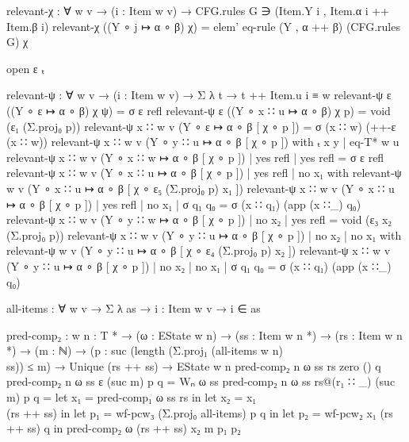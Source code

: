 {\begin{code}
			  relevant-χ : ∀ {w v} → (i : Item w v) → CFG.rules G ∋ (Item.Y i , Item.α i ++ Item.β i)
			  relevant-χ ((Y ∘ j ↦ α ∘ β) {χ}) = elem' eq-rule (Y , α ++ β) (CFG.rules G) χ

			  open ε ₜ

			  relevant-ψ : ∀ {w v} → (i : Item w v) → Σ λ t → t ++ Item.u i ≡ w
			  relevant-ψ {ε} ((Y ∘ ε ↦ α ∘ β) {χ} {ψ}) = σ ε refl
			  relevant-ψ {ε} ((Y ∘ x ∷ u ↦ α ∘ β) {χ} {p}) = void (ε₁ (Σ.proj₀ p))
			  relevant-ψ {x ∷ w} {v} (Y ∘ ε ↦ α ∘ β [ χ ∘ p ]) = σ (x ∷ w) (++-ε (x ∷ w))
			  relevant-ψ {x ∷ w} {v} (Y ∘ y ∷ u ↦ α ∘ β [ χ ∘ p ]) with ₜ x y | eq-T* w u
			  relevant-ψ {x ∷ w} {v} (Y ∘ x ∷ w ↦ α ∘ β [ χ ∘ p ]) | yes refl | yes refl = σ ε refl
			  relevant-ψ {x ∷ w} {v} (Y ∘ x ∷ u ↦ α ∘ β [ χ ∘ p ]) | yes refl | no x₁ with relevant-ψ {w} {v} (Y ∘ x ∷ u ↦ α ∘ β [ χ ∘ ε₅ (Σ.proj₀ p) x₁ ])
			  relevant-ψ {x ∷ w} {v} (Y ∘ x ∷ u ↦ α ∘ β [ χ ∘ p ]) | yes refl | no x₁ | σ q₁ q₀ = σ (x ∷ q₁) (app (x ∷_) q₀)
			  relevant-ψ {x ∷ w} {v} (Y ∘ y ∷ w ↦ α ∘ β [ χ ∘ p ]) | no x₂    | yes refl = void (ε₃ x₂ (Σ.proj₀ p))
			  relevant-ψ {x ∷ w} {v} (Y ∘ y ∷ u ↦ α ∘ β [ χ ∘ p ]) | no x₂    | no x₁ with relevant-ψ {w} {v} (Y ∘ y ∷ u ↦ α ∘ β [ χ ∘ ε₄ (Σ.proj₀ p) x₂ ])
			  relevant-ψ {x ∷ w} {v} (Y ∘ y ∷ u ↦ α ∘ β [ χ ∘ p ]) | no x₂    | no x₁ | σ q₁ q₀ = σ (x ∷ q₁) (app (x ∷_) q₀)

		\end{code}}
		\begin{code}
			  all-items : ∀ {w} {v} → Σ λ as → {i : Item w v} → i ∈ as
		\end{code}

		\begin{code}
			  pred-comp₂ : {w n : T *} →
			    (ω : EState w n) →
			    (ss : Item w n *) →
			    (rs : Item w n *) →
			    (m : ℕ) →
			    (p : suc (length (Σ.proj₁ (all-items {w} {n}) \\ ss)) ≤ m) →
			    Unique (rs ++ ss) →
			    EState w n
			  pred-comp₂ {n} ω ss rs zero () q
			  pred-comp₂ {n} ω ss ε (suc m) p q = Wₙ ω ss
			  pred-comp₂ {n} ω ss rs@(r₁ ∷ _) (suc m) p q =
			    let x₁ = pred-comp₁ ω ss rs in
			    let x₂ = x₁ \\ (rs ++ ss) in
			    let p₁ = wf-pcw₃ (Σ.proj₀ all-items) p q in
			    let p₂ = wf-pcw₂ x₁ (rs ++ ss) q in
			    pred-comp₂ ω (rs ++ ss) x₂ m p₁ p₂
		\end{code}

